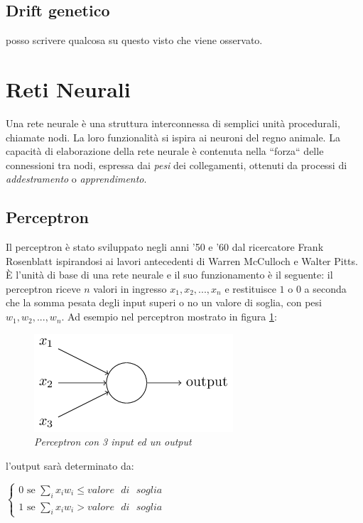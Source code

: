 \documentclass[12pt,a4paper]{report}
\begin{document}
\subsection{Drift genetico}

posso scrivere qualcosa su questo visto che viene osservato.

\section{Reti Neurali}

Una rete neurale è una struttura interconnessa di semplici unità procedurali, chiamate nodi. La loro funzionalità si ispira ai neuroni del regno animale. La capacità di elaborazione della rete neurale è contenuta nella ``forza`` delle connessioni tra nodi, espressa dai \textit{pesi} dei collegamenti, ottenuti da processi di \textit{ addestramento} o \textit{apprendimento}. \cite{neural-net-gurney}

\subsection{Perceptron}

\cite{neural-net-nielsen}
Il perceptron è stato sviluppato negli anni '50 e '60 dal ricercatore Frank Rosenblatt ispirandosi ai lavori antecedenti di Warren McCulloch e Walter Pitts.
È l'unità di base di una rete neurale e il suo funzionamento è il seguente:
il perceptron riceve $n$ valori in ingresso $x_{1},x_{2},...,x_{n}$ e restituisce $1$ o $0$ a seconda che la somma pesata degli input superi o no un valore di soglia, con pesi $w_{1},w_{2},...,w_{n}$.
Ad esempio nel perceptron mostrato in figura \ref{perceptron}:

\begin{figure}[H]
 \centering
 \includegraphics[scale = 0.7]{images/perceptron.png}
 \caption{\textit{Perceptron con 3 input ed un output}}
 \label{perceptron}
\end{figure}

l'output sarà determinato da:

\begin{center}
$\begin{cases}
 0 \text{ se } \sum_{i} x_{i}w_{i} \leq valore\text{ }di\text{ }soglia\\
 1 \text{ se } \sum_{i} x_{i}w_{i} > valore\text{ }di\text{ }soglia 
\end{cases} $
\end{center}
\end{document}
